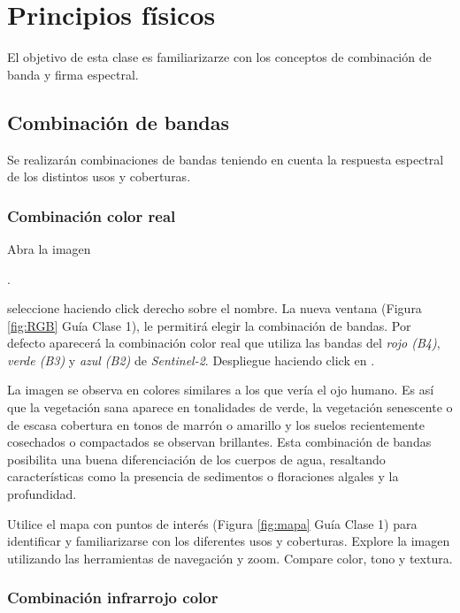 \chapter{Principios físicos}

El objetivo de esta clase es familiarizarze con los conceptos de combinación de banda y firma espectral.



\section{Combinación de bandas}
Se realizarán combinaciones de bandas teniendo en cuenta la respuesta espectral de los distintos usos y coberturas.


\subsection{Combinación color real}\label{sec:colorreal}

Abra la imagen \begin{center} .
\end{center} seleccione  haciendo click derecho sobre el nombre. La nueva ventana (Figura \ref{fig:RGB} Guía Clase 1), le permitirá elegir la combinación de bandas. Por defecto aparecerá la combinación color real que utiliza las bandas del \emph{rojo (B4)}, \emph{verde (B3)} y \emph{azul (B2)} de \emph{Sentinel-2}. Despliegue haciendo click en .

La imagen se observa en colores similares a los que vería el ojo humano. Es así que la vegetación sana aparece en tonalidades de verde, la vegetación senescente o de escasa cobertura en tonos de marrón o amarillo y los suelos recientemente cosechados o compactados se observan brillantes. Esta combinación de bandas posibilita una buena diferenciación de los cuerpos de agua, resaltando características como la presencia de sedimentos o floraciones algales y la profundidad.

Utilice el mapa con puntos de interés (Figura \ref{fig:mapa} Guía Clase 1) para identificar y familiarizarse con los diferentes usos y coberturas. Explore la imagen utilizando las herramientas de navegación y zoom. Compare color, tono y textura.


\subsection{Combinación infrarrojo color}
\label{sec:infrarrojocolor}

